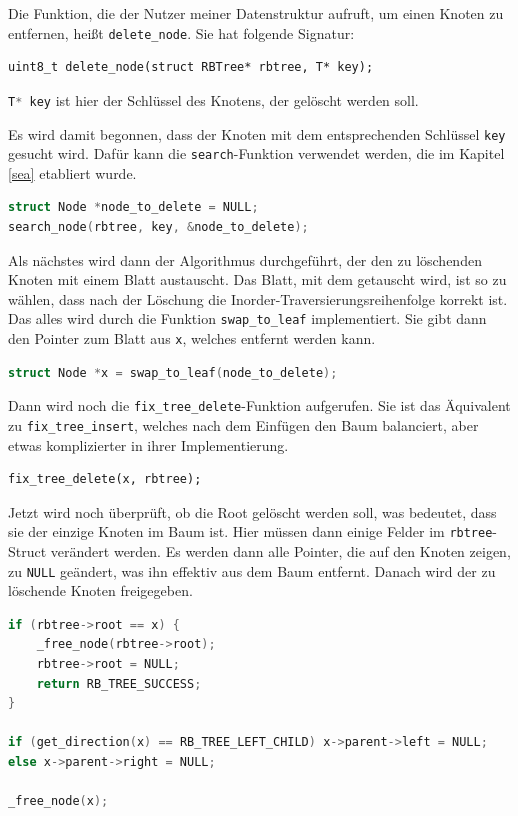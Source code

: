 \documentclass[11pt]{article}
\newcommand{\lstin}[1]{\lstinline[language=C]{#1}}
\begin{document}
Die Funktion, die der Nutzer meiner Datenstruktur aufruft, um einen Knoten zu entfernen, heißt \lstin{delete_node}.
Sie hat folgende Signatur:

\begin{lstlisting}
uint8_t delete_node(struct RBTree* rbtree, T* key);
\end{lstlisting}

\lstin{T* key} ist hier der Schlüssel des Knotens, der gelöscht werden soll.

Es wird damit begonnen, dass der Knoten mit dem entsprechenden Schlüssel \lstin{key} gesucht wird.
Dafür kann die \lstin{search}-Funktion verwendet werden, die im Kapitel \ref{sea} etabliert wurde.

\begin{lstlisting}[language=C]
struct Node *node_to_delete = NULL;
search_node(rbtree, key, &node_to_delete);
\end{lstlisting}

Als nächstes wird dann der Algorithmus durchgeführt, der den zu löschenden Knoten mit einem Blatt austauscht.
Das Blatt, mit dem getauscht wird, ist so zu wählen, dass nach der Löschung die Inorder-Traversierungsreihenfolge korrekt ist.
Das alles wird durch die Funktion \lstin{swap_to_leaf} implementiert. Sie gibt dann den Pointer zum Blatt aus \lstin{x}, welches entfernt werden kann.
\begin{lstlisting}[language=C]
struct Node *x = swap_to_leaf(node_to_delete);
\end{lstlisting}

Dann wird noch die \lstin{fix_tree_delete}-Funktion aufgerufen.
Sie ist das Äquivalent zu \lstin{fix_tree_insert}, welches nach dem Einfügen den Baum balanciert,
aber etwas komplizierter in ihrer Implementierung.

\begin{lstlisting}
fix_tree_delete(x, rbtree);
\end{lstlisting}

Jetzt wird noch überprüft, ob die Root gelöscht werden soll, was bedeutet,
dass sie der einzige Knoten im Baum ist. Hier müssen dann einige Felder im \lstin{rbtree}-Struct
verändert werden. Es werden dann alle Pointer, die auf den Knoten zeigen, zu \lstin{NULL} geändert,
was ihn effektiv aus dem Baum entfernt. Danach wird der zu löschende Knoten freigegeben.

\begin{lstlisting}[language=C]
if (rbtree->root == x) {
    _free_node(rbtree->root);
    rbtree->root = NULL;
    return RB_TREE_SUCCESS;
}

if (get_direction(x) == RB_TREE_LEFT_CHILD) x->parent->left = NULL;
else x->parent->right = NULL;

_free_node(x);
\end{lstlisting}
\end{document}

